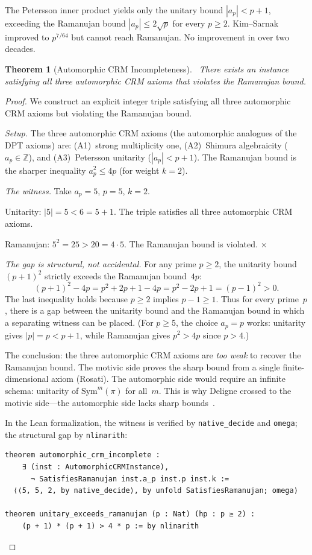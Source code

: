 \documentclass[11pt]{article}
\newtheorem{theorem}{Theorem}[section]
\theoremstyle{definition}
\theoremstyle{remark}
\newcommand{\leanok}{\textsf{\small \textcolor{green!70!black}{\checkmark}}}
\newcommand{\Z}{\mathbb{Z}}
\begin{document}
The Petersson inner product yields only the unitary bound $|a_p| < p + 1$, exceeding the Ramanujan bound $|a_p| \leq 2\sqrt{p}$ for every $p \geq 2$. Kim--Sarnak~\cite{KimSarnak} improved to $p^{7/64}$ but cannot reach Ramanujan. No improvement in over two decades.

\begin{theorem}[Automorphic CRM Incompleteness]
\label{thm:C}
\leanok\ There exists an instance satisfying all three automorphic CRM axioms that violates the Ramanujan bound.
\end{theorem}

\begin{proof}
We construct an explicit integer triple satisfying all three automorphic CRM axioms but violating the Ramanujan bound.

\emph{Setup.} The three automorphic CRM axioms (the automorphic analogues of the DPT axioms) are: (A1)~strong multiplicity one, (A2)~Shimura algebraicity ($a_p \in \Z$), and (A3)~Petersson unitarity ($|a_p| < p + 1$). The Ramanujan bound is the sharper inequality $a_p^2 \leq 4p$ (for weight $k = 2$).

\emph{The witness.} Take $a_p = 5$, $p = 5$, $k = 2$.

Unitarity: $|5| = 5 < 6 = 5 + 1$. The triple satisfies all three automorphic CRM axioms. \checkmark

Ramanujan: $5^2 = 25 > 20 = 4 \cdot 5$. The Ramanujan bound is violated. $\times$

\emph{The gap is structural, not accidental.} For any prime $p \geq 2$, the unitarity bound $(p+1)^2$ strictly exceeds the Ramanujan bound~$4p$:
\[
  (p+1)^2 - 4p = p^2 + 2p + 1 - 4p = p^2 - 2p + 1 = (p-1)^2 > 0.
\]
The last inequality holds because $p \geq 2$ implies $p - 1 \geq 1$. Thus for every prime~$p$, there is a gap between the unitarity bound and the Ramanujan bound in which a separating witness can be placed. (For $p \geq 5$, the choice $a_p = p$ works: unitarity gives $|p| = p < p + 1$, while Ramanujan gives $p^2 > 4p$ since $p > 4$.)

The conclusion: the three automorphic CRM axioms are \emph{too weak} to recover the Ramanujan bound. The motivic side proves the sharp bound from a single finite-dimensional axiom (Rosati). The automorphic side would require an infinite schema: unitarity of $\mathrm{Sym}^m(\pi)$ for all~$m$. This is why Deligne crossed to the motivic side---the automorphic side lacks sharp bounds~\cite{Deligne74}.

In the Lean formalization, the witness is verified by \texttt{native\_decide} and \texttt{omega}; the structural gap by \texttt{nlinarith}:
\begin{lstlisting}
theorem automorphic_crm_incomplete :
    ∃ (inst : AutomorphicCRMInstance),
      ¬ SatisfiesRamanujan inst.a_p inst.p inst.k :=
  ⟨⟨5, 5, 2, by native_decide⟩, by unfold SatisfiesRamanujan; omega⟩

theorem unitary_exceeds_ramanujan (p : Nat) (hp : p ≥ 2) :
    (p + 1) * (p + 1) > 4 * p := by nlinarith
\end{lstlisting}
\end{proof}
\end{document}
